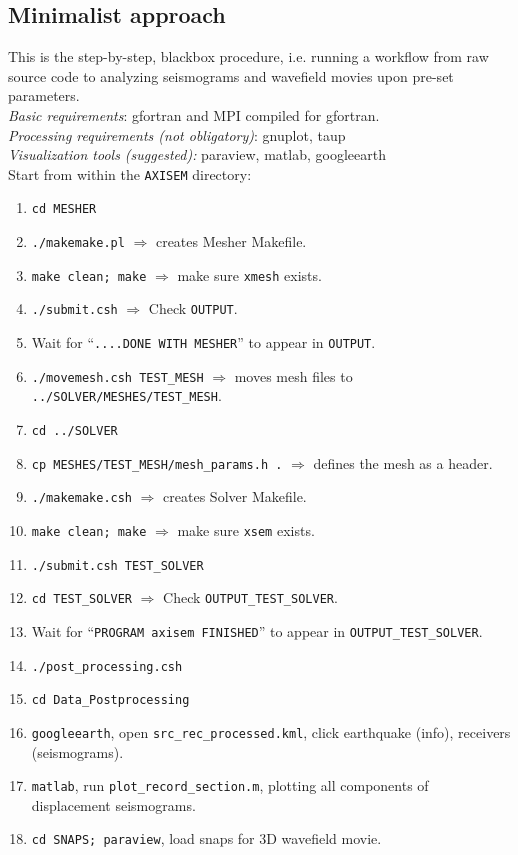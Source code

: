 \documentclass[11pt,letter,fleqn,english,notitlepage]{article}
\begin{document}
\subsection{Minimalist approach}
This is the step-by-step, blackbox procedure, i.e. running a workflow from raw source code to analyzing 
seismograms and wavefield movies upon pre-set parameters.\\

\noindent \textit{Basic requirements}: gfortran and MPI compiled for gfortran.\\
\textit{Processing requirements (not obligatory)}: gnuplot, taup\\
\textit{Visualization tools (suggested):} paraview, matlab, googleearth\\

\noindent Start from within the {\tt AXISEM} directory:
\begin{enumerate}
\item {\tt cd MESHER}
\item {\tt ./makemake.pl} $\Rightarrow$ creates Mesher Makefile.
\item {\tt make clean; make} $\Rightarrow$ make sure {\tt xmesh} exists.
\item {\tt ./submit.csh} $\Rightarrow$ Check {\tt OUTPUT}.
\item Wait for ``{\tt ....DONE WITH MESHER}'' to appear in {\tt OUTPUT}.
\item {\tt ./movemesh.csh TEST\_MESH} $\Rightarrow$ moves mesh files to {\tt ../SOLVER/MESHES/TEST\_MESH}.
\item {\tt cd ../SOLVER}
\item {\tt cp MESHES/TEST\_MESH/mesh\_params.h .} $\Rightarrow$ defines the mesh as a header.
\item {\tt ./makemake.csh} $\Rightarrow$ creates Solver Makefile.
\item {\tt make clean; make} $\Rightarrow$ make sure {\tt xsem} exists.
\item {\tt ./submit.csh TEST\_SOLVER} 
\item {\tt cd TEST\_SOLVER} $\Rightarrow$ Check {\tt OUTPUT\_TEST\_SOLVER}.
\item Wait for ``{\tt  PROGRAM axisem FINISHED}'' to appear in {\tt OUTPUT\_TEST\_SOLVER}.
\item {\tt ./post\_processing.csh}
\item {\tt cd Data\_Postprocessing} 
\item {\tt googleearth}, open {\tt src\_rec\_processed.kml}, click earthquake (info), receivers (seismograms).
\item {\tt matlab}, run {\tt plot\_record\_section.m}, plotting all components of displacement seismograms.
\item {\tt cd SNAPS; paraview}, load snaps for 3D wavefield movie.
\end{enumerate}
\end{document}
